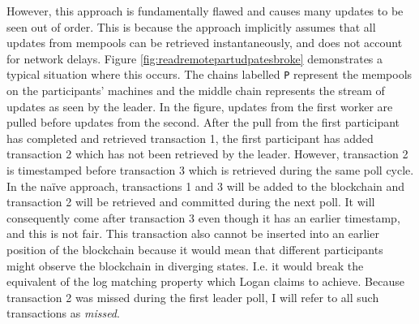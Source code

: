 \documentclass[12pt,a4paper,twoside,openright]{report}
\begin{document}
	However, this approach is fundamentally flawed and causes many updates to be seen out of order. 
	This is because the approach implicitly assumes that all updates from mempools can be retrieved instantaneously, and does not account for network delays.
	Figure \ref{fig:readremotepartudpatesbroke} demonstrates a typical situation where this occurs.
	The chains labelled \texttt{P} represent the mempools on the participants' machines and the middle chain represents the stream of updates as seen by the leader.
	In the figure, updates from the first worker are pulled before updates from the second.
	After the pull from the first participant has completed and retrieved transaction 1, the first participant has added transaction 2 which has not been retrieved by the leader. 
	However, transaction 2 is timestamped before transaction 3 which is retrieved during the same poll cycle.
	In the na\"{i}ve approach, transactions 1 and 3 will be added to the blockchain and transaction 2 will be retrieved and committed during the next poll.
	It will consequently come after transaction 3 even though it has an earlier timestamp, and this is not fair.
	This transaction also cannot be inserted into an earlier position of the blockchain because it would mean that different participants might observe the blockchain in diverging states.
	I.e. it would break the equivalent of the log matching property which Logan claims to achieve.
	Because transaction 2 was missed during the first leader poll, I will refer to all such transactions as \textit{missed}.
\end{document}

